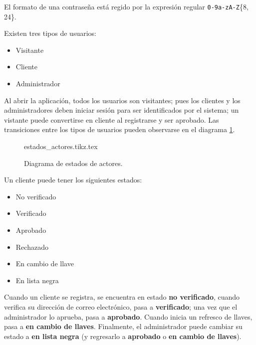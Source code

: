 
{
  El formato de una contraseña está regido por la expresión regular
  \texttt{0-9a-zA-Z}\{8, 24\}.
}

{
  Existen tres tipos de usuarios:
  \begin{itemize}
    \item Visitante
    \item Cliente
    \item Administrador
  \end{itemize}

  \begin{hangparas}{2em}{0}
    Al abrir la aplicación, todos los usuarios son visitantes; pues los clientes
    y los administradores deben iniciar sesión para ser identificados por el
    sistema; un vistante puede convertirse en cliente al registrarse y ser
    aprobado. Las transiciones entre los tipos de usuarios pueden observarse en
    el diagrama \ref{estados_actores}.
  \end{hangparas}
}

\begin{figure}
  \begin{center}
    {estados_actores.tikz.tex}
    \caption{Diagrama de estados de actores.}
    \label{estados_actores}
  \end{center}
\end{figure}

{
  Un cliente puede tener los siguientes estados:
  \begin{itemize}
    \item No verificado
    \item Verificado
    \item Aprobado
    \item Rechazado
    \item En cambio de llave
    \item En lista negra
  \end{itemize}

  \begin{hangparas}{2em}{0}
    Cuando un cliente se registra, se encuentra en estado \textbf{no verificado},
    cuando verifica su dirección de correo electrónico, pasa a
    \textbf{verificado}; una vez que el administrador lo aprueba, pasa a
    \textbf{aprobado}. Cuando inicia un refresco de llaves, pasa a
    \textbf{en cambio de llaves}. Finalmente, el administrador puede cambiar su
    estado a \textbf{en lista negra} (y regresarlo a \textbf{aprobado} o
    \textbf{en cambio de llaves}).
  \end{hangparas}
}

